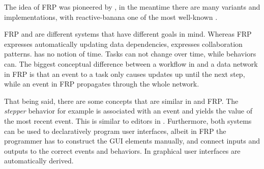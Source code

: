 The idea of FRP was pioneered by \citet{conf/icfp/ElliottH97}, in the meantime there are many variants and implementations, with reactive-banana one of the most well-known \cite{reactive-banana}.

FRP and \TOP are different systems that have different goals in mind.
Whereas FRP expresses automatically updating data dependencies, \TOP expresses collaboration patterns.
\TOP has no notion of time.
Tasks can not change over time, while behaviors can.
The biggest conceptual difference between a workflow in \TOP and a data network in FRP is that an event to a task only causes updates up until the next step, while an event in FRP propagates through the whole network.

That being said, there are some concepts that are similar in \TOP and FRP.
The \emph{stepper} behavior for example is associated with an event and yields the value of the most recent event.
This is similar to editors in \TOP.
Furthermore, both systems can be used to declaratively program user interfaces, albeit in FRP the programmer has to construct the GUI elements manually, and connect inputs and outputs to the correct events and behaviors.
In \TOP graphical user interfaces are automatically derived.
